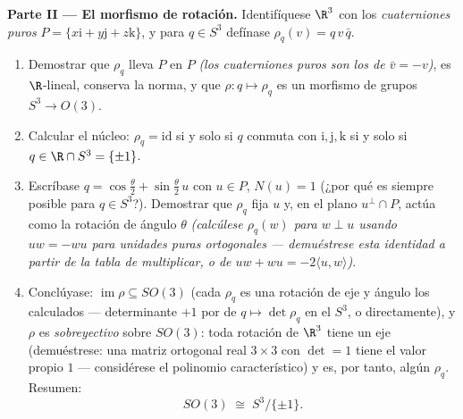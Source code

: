 \begin{problem}
\medskip
\noindent\textbf{Parte II --- El morfismo de rotación.} Identifíquese
$\R^3$ con los \emph{cuaterniones puros} $P = \{x\mathrm i +
y\mathrm j + z\mathrm k\}$, y para $q \in S^3$ defínase
$\rho_q(v) = q\,v\,\bar q$.
\begin{enumerate}[resume]
  \item Demostrar que $\rho_q$ lleva $P$ en $P$ \emph{(los cuaterniones
  puros son los de $\bar v = -v$)}, es $\R$-lineal, conserva la norma, y
  que $\rho
        \colon q \mapsto \rho_q$ es un morfismo de grupos $S^3
        \to O(3)$. \item Calcular el núcleo: $\rho_q = \mathrm{id}$ si y
  solo si $q$ conmuta con $\mathrm i, \mathrm j, \mathrm k$ si y solo si
        $q \in \R\cap S^3 = \{\pm1\}$.
  \item Escríbase $q = \cos\frac\theta2 + \sin\frac\theta2\,u$ con
  $u \in P$, $N(u) = 1$ (¿por qué es siempre posible para $q \in S^3$?).
  Demostrar que $\rho_q$ fija $u$ y, en el plano $u^\perp\cap P$, actúa
  como la rotación de ángulo $\theta$ \emph{(calcúlese $\rho_q(w)$ para
  $w \perp u$ usando $uw = -wu$ para unidades puras ortogonales ---
  demuéstrese esta identidad a partir de la tabla de multiplicar, o de
  $uw + wu =
        -2\langle u, w\rangle$)}. \item Conclúyase:
  $\operatorname{im}\rho \subseteq SO(3)$ (cada $\rho_q$ es una rotación
  de eje y ángulo los calculados --- determinante $+1$ por
   de $q
        \mapsto \det\rho_q$ en el
   $S^3$, o directamente), y
  $\rho$ es \emph{sobreyectivo} sobre $SO(3)$: toda rotación de $\R^3$
  tiene un eje (demuéstrese: una matriz ortogonal real $3\times3$ con
  $\det = 1$ tiene el valor propio $1$ --- considérese el polinomio
  característico) y es, por tanto, algún $\rho_q$. Resumen:
        \[
        SO(3) \;\cong\; S^3/\{\pm 1\} .
        \]
\end{enumerate}


\end{problem}
